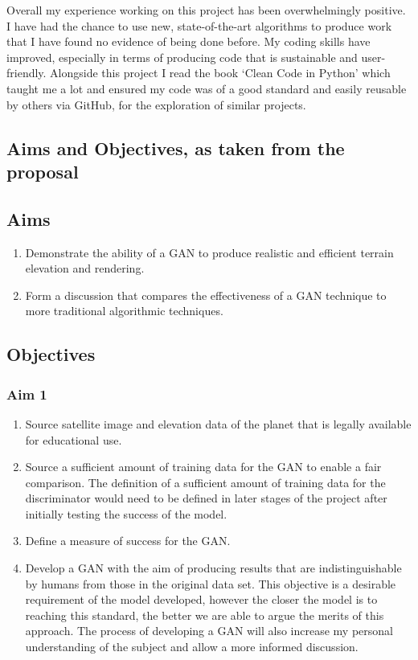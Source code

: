 \documentclass[a4paper]{report}
\begin{document}
Overall my experience working on this project has been overwhelmingly positive. I have had the chance to use new, state-of-the-art algorithms to produce work that I have found no evidence of being done before. My coding skills have improved, especially in terms of producing code that is sustainable and user-friendly. Alongside this project I read the book `Clean Code in Python' \cite{clean} which taught me a lot and ensured my code was of a good standard and easily reusable by others via GitHub, for the exploration of similar projects.
\renewcommand\bibname{References}


\begin{appendices}
\section{Aims and Objectives, as taken from the proposal}
\label{appendix:proposal}
\subsection{Aims}
\begin{enumerate}
    \item Demonstrate the ability of a GAN to produce realistic and efficient terrain elevation and rendering.
    \item Form a discussion that compares the effectiveness of a GAN technique to more traditional algorithmic techniques.
\end{enumerate}
\subsection{Objectives}
\subsubsection{Aim 1}
\begin{enumerate}
\renewcommand{\theenumi}{\alph{enumi}}
    \item Source satellite image and elevation data of the planet that is legally available for educational use.
    \item Source a sufficient amount of training data for the GAN to enable a fair comparison. The definition of a sufficient amount of training data for the discriminator would need to be defined in later stages of the project after initially testing the success of the model.
    \item Define a measure of success for the GAN.
    \item Develop a GAN with the aim of producing results that are indistinguishable by humans from those in the original data set. This objective is a desirable requirement of the model developed, however the closer the model is to reaching this standard, the better we are able to argue the merits of this approach. The process of developing a GAN will also increase my personal understanding of the subject and allow a more informed discussion.
\end{enumerate}

\end{appendices}
\end{document}
